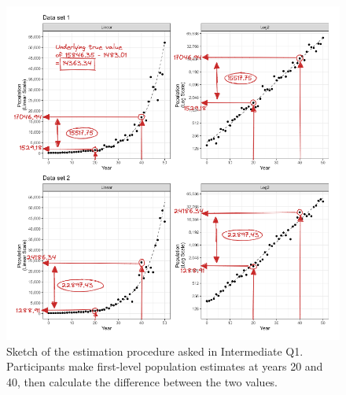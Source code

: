 \documentclass[print]{nuthesis}
\begin{document}
\begin{figure}[tbp]

{\centering \includegraphics[width=1\linewidth,]{images/03-estimation/qi1-sketch} 

}

\caption[Intermediate Q1 sketch]{Sketch of the estimation procedure asked in Intermediate Q1. Participants make first-level population estimates at years 20 and 40, then calculate the difference between the two values.}\label{fig:qi1-sketch}
\end{figure}
\end{document}
